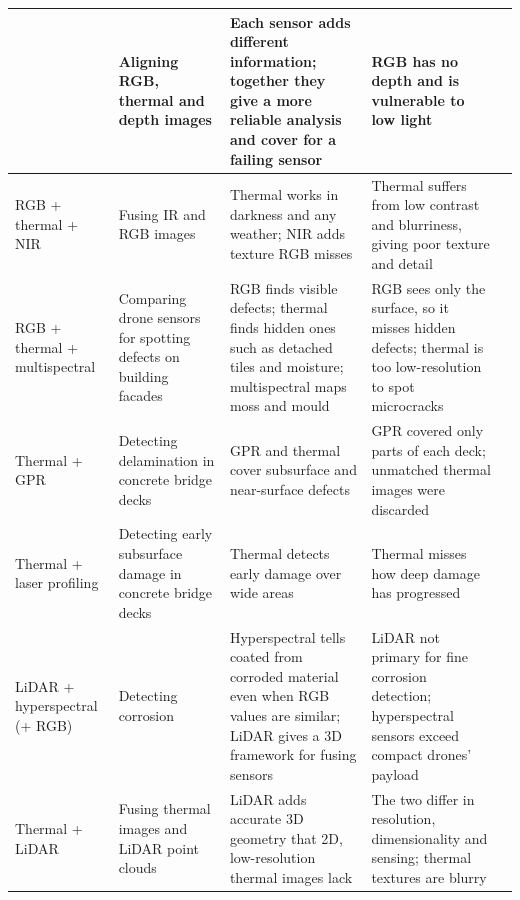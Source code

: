 {\begin{xltabular}{\textwidth}{>{\RaggedRight\arraybackslash}p{2.1cm}>{\RaggedRight\arraybackslash}p{2.9cm}>{\RaggedRight\arraybackslash}X>{\RaggedRight\arraybackslash}Xp{0.95cm}}
 & Aligning RGB, thermal and depth images & Each sensor adds different information; together they give a more reliable analysis and cover for a failing sensor & RGB has no depth and is vulnerable to low light & \citep{Nooralishahi2022} \\
\midrule
RGB + thermal + NIR & Fusing IR and RGB images & Thermal works in darkness and any weather; NIR adds texture RGB misses & Thermal suffers from low contrast and blurriness, giving poor texture and detail & \citep{Laidouni2025} \\
\midrule
RGB + thermal + multispectral & Comparing drone sensors for spotting defects on building facades & RGB finds visible defects; thermal finds hidden ones such as detached tiles and moisture; multispectral maps moss and mould & RGB sees only the surface, so it misses hidden defects; thermal is too low-resolution to spot microcracks & \citep{Guedes2025} \\
\midrule
Thermal + GPR & Detecting delamination in concrete bridge decks & GPR and thermal cover subsurface and near-surface defects & GPR covered only parts of each deck; unmatched thermal images were discarded & \citep{Rashidi2026} \\
\midrule
Thermal + laser profiling & Detecting early subsurface damage in concrete bridge decks & Thermal detects early damage over wide areas & Thermal misses how deep damage has progressed & \citep{Yamashita2025} \\
\midrule
LiDAR + hyperspectral (+ RGB) & Detecting corrosion & Hyperspectral tells coated from corroded material even when RGB values are similar; LiDAR gives a 3D framework for fusing sensors & LiDAR not primary for fine corrosion detection; hyperspectral sensors exceed compact drones' payload & \citep{PallasEnguita2025} \\
\midrule
Thermal + LiDAR & Fusing thermal images and LiDAR point clouds & LiDAR adds accurate 3D geometry that 2D, low-resolution thermal images lack & The two differ in resolution, dimensionality and sensing; thermal textures are blurry & \citep{Zhu2026a} \\
\end{xltabular}
}

